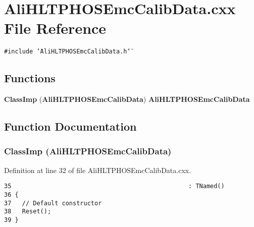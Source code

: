 \section{Ali\-HLTPHOSEmc\-Calib\-Data.cxx File Reference}
\label{AliHLTPHOSEmcCalibData_8cxx}


{\tt \#include \char`\"{}Ali\-HLTPHOSEmc\-Calib\-Data.h\char`\"{}}\par
\subsection*{Functions}
\begin{CompactItemize}
\item 
{\bf Class\-Imp} ({\bf Ali\-HLTPHOSEmc\-Calib\-Data}) {\bf Ali\-HLTPHOSEmc\-Calib\-Data}
\end{CompactItemize}


\subsection{Function Documentation}
\subsubsection{\setlength{\rightskip}{0pt plus 5cm}Class\-Imp ({\bf Ali\-HLTPHOSEmc\-Calib\-Data})}\label{AliHLTPHOSEmcCalibData_8cxx_a0}




Definition at line 32 of file Ali\-HLTPHOSEmc\-Calib\-Data.cxx.

\footnotesize\begin{verbatim}35                                                 : TNamed()
36 {
37   // Default constructor
38   Reset();
39 }
\end{verbatim}\normalsize 


